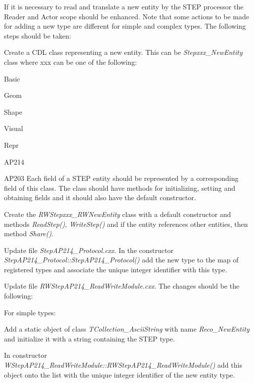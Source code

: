 If it is necessary to read and translate a new entity by the S\+T\+EP processor the Reader and Actor scope should be enhanced. Note that some actions to be made for adding a new type are different for simple and complex types. The following steps should be taken\+:
\begin{DoxyItemize}
\item Create a C\+DL class representing a new entity. This can be {\itshape Stepxxx\+\_\+\+New\+Entity} class where xxx can be one of the following\+:
\begin{DoxyItemize}
\item Basic
\item Geom
\item Shape
\item Visual
\item Repr
\item A\+P214
\item A\+P203 Each field of a S\+T\+EP entity should be represented by a corresponding field of this class. The class should have methods for initializing, setting and obtaining fields and it should also have the default constructor.
\end{DoxyItemize}
\item Create the {\itshape R\+W\+Stepxxx\+\_\+\+R\+W\+New\+Entity} class with a default constructor and methods {\itshape Read\+Step()}, {\itshape Write\+Step()} and if the entity references other entities, then method {\itshape Share()}.
\item Update file {\itshape Step\+A\+P214\+\_\+\+Protocol.\+cxx}. In the constructor {\itshape Step\+A\+P214\+\_\+\+Protocol\+::\+Step\+A\+P214\+\_\+\+Protocol()} add the new type to the map of registered types and associate the unique integer identifier with this type.
\item Update file {\itshape R\+W\+Step\+A\+P214\+\_\+\+Read\+Write\+Module.\+cxx}. The changes should be the following\+:
\begin{DoxyItemize}
\item For simple types\+:
\begin{DoxyItemize}
\item Add a static object of class {\itshape T\+Collection\+\_\+\+Ascii\+String} with name {\itshape Reco\+\_\+\+New\+Entity} and initialize it with a string containing the S\+T\+EP type.
\item In constructor {\itshape W\+Step\+A\+P214\+\_\+\+Read\+Write\+Module\+::\+R\+W\+Step\+A\+P214\+\_\+\+Read\+Write\+Module()} add this object onto the list with the unique integer identifier of the new entity type.

\end{DoxyItemize}
\end{DoxyItemize}
\end{DoxyItemize}
